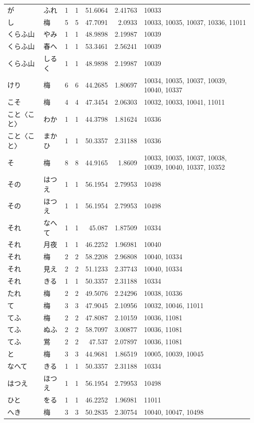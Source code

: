 \begin{tabular}{llrrrrl}
が & ふれ & 1 & 1 & 51.6064 & 2.41763 & 10033 \\
し & 梅 & 5 & 5 & 47.7091 & 2.0933 & 10033, 10035, 10037, 10336, 11011 \\
くらふ山 & やみ & 1 & 1 & 48.9898 & 2.19987 & 10039 \\
くらふ山 & 春へ & 1 & 1 & 53.3461 & 2.56241 & 10039 \\
くらふ山 & しるく & 1 & 1 & 48.9898 & 2.19987 & 10039 \\
けり & 梅 & 6 & 6 & 44.2685 & 1.80697 & 10034, 10035, 10037, 10039, 10040, 10337 \\
こそ & 梅 & 4 & 4 & 47.3454 & 2.06303 & 10032, 10033, 10041, 11011 \\
こと〈こと〉 & わか & 1 & 1 & 44.3798 & 1.81624 & 10336 \\
こと〈こと〉 & まかひ & 1 & 1 & 50.3357 & 2.31188 & 10336 \\
そ & 梅 & 8 & 8 & 44.9165 & 1.8609 & 10033, 10035, 10037, 10038, 10039, 10040, 10337, 10352 \\
その & はつえ & 1 & 1 & 56.1954 & 2.79953 & 10498 \\
その & ほつえ & 1 & 1 & 56.1954 & 2.79953 & 10498 \\
それ & なへて & 1 & 1 & 45.087 & 1.87509 & 10334 \\
それ & 月夜 & 1 & 1 & 46.2252 & 1.96981 & 10040 \\
それ & 梅 & 2 & 2 & 58.2208 & 2.96808 & 10040, 10334 \\
それ & 見え & 2 & 2 & 51.1233 & 2.37743 & 10040, 10334 \\
それ & きる & 1 & 1 & 50.3357 & 2.31188 & 10334 \\
たれ & 梅 & 2 & 2 & 49.5076 & 2.24296 & 10038, 10336 \\
て & 梅 & 3 & 3 & 47.9045 & 2.10956 & 10032, 10046, 11011 \\
てふ & 梅 & 2 & 2 & 47.8087 & 2.10159 & 10036, 11081 \\
てふ & ぬふ & 2 & 2 & 58.7097 & 3.00877 & 10036, 11081 \\
てふ & 鴬 & 2 & 2 & 47.537 & 2.07897 & 10036, 11081 \\
と & 梅 & 3 & 3 & 44.9681 & 1.86519 & 10005, 10039, 10045 \\
なへて & きる & 1 & 1 & 50.3357 & 2.31188 & 10334 \\
はつえ & ほつえ & 1 & 1 & 56.1954 & 2.79953 & 10498 \\
ひと & をる & 1 & 1 & 46.2252 & 1.96981 & 11011 \\
へき & 梅 & 3 & 3 & 50.2835 & 2.30754 & 10040, 10047, 10498 \\

\end{tabular}
